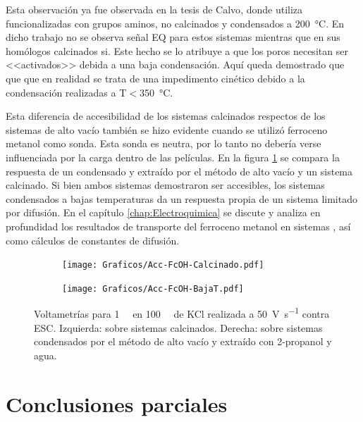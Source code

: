       Esta observación ya fue observada en la tesis de Calvo\cite{Calvo20210}, donde utiliza \pdmF\space funcionalizadas con grupos aminos, no calcinados y condensados a \SI{200}{\celsius}. En dicho trabajo no se observa señal EQ para estos sistemas mientras que en sus homólogos calcinados si. Este hecho se lo atribuye a que los poros necesitan ser <<activados>> debida a una baja condensación. Aquí queda demostrado que que que en realidad se trata de una impedimento cinético debido a la condensación realizadas a T$<$\SI{350}{\celsius}.

      Esta diferencia de accesibilidad de los sistemas calcinados respectos de los sistemas de alto vacío también se hizo evidente cuando se utilizó ferroceno metanol como sonda. Esta sonda es neutra, por lo tanto no debería verse influenciada por la carga dentro de las películas. En la figura \ref{fig:fcOH_accesibilidad} se compara la respuesta de un \pdmF\space condensado y extraído por el método de alto vacío y un sistema \pdmF\space calcinado. Si bien ambos sistemas demostraron ser accesibles, los sistemas condensados a bajas temperaturas da un respuesta propia de un sistema limitado por difusión. En el capítulo \ref{chap:Electroquimica} se discute y analiza en profundidad  los resultados de transporte del ferroceno metanol en sistemas \pdmF, así como cálculos de constantes de difusión.

      		\begin{figure}[ht!]
		 	\begin{subfigure}[t]{0.5\textwidth}
		          	\texttt{[image: Graficos/Acc-FcOH-Calcinado.pdf]}
		          	\end{subfigure}
		    \begin{subfigure}[t]{0.5\textwidth}
		          	\texttt{[image: Graficos/Acc-FcOH-BajaT.pdf]}
		         	\end{subfigure}
		         	\caption[Voltagrama comparativo SF calcinados/alto vacío II]{Voltametrías para \fc\space \SI{1}{\milli\Molar} en \SI{100}{\milli\Molar} de KCl realizada a \SI{50}{\volt\per\second} contra ESC. Izquierda: sobre sistemas \pdmF\space calcinados. Derecha: sobre sistemas \pdmF\space condensados por el método de alto vacío y extraído con 2-propanol y agua.}
		         	\label{fig:fcOH_accesibilidad}
		    \end{figure}     	

\section{Conclusiones parciales}
	
